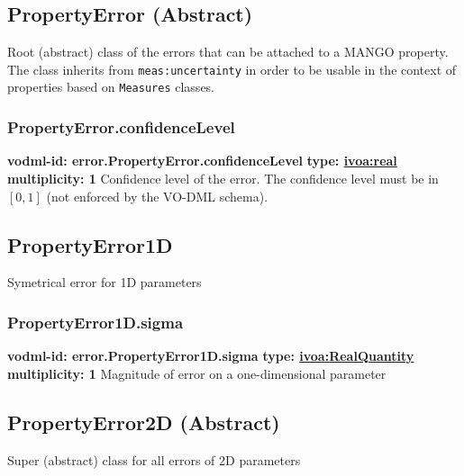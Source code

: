   \subsection{PropertyError (Abstract)}
  \label{sect:error.PropertyError}
    Root (abstract) class of the errors that can be attached to a MANGO property. The class inherits from \texttt{meas:uncertainty} in order to be usable in the context of properties based on \texttt{Measures} classes.

    \subsubsection{PropertyError.confidenceLevel}
      \textbf{vodml-id: error.PropertyError.confidenceLevel} \newline
      \textbf{type: \hyperref[sect:ivoa]{ivoa:real}} \newline
      \textbf{multiplicity: 1} \newline
      Confidence level of the error. The confidence level must be in $[0, 1]$ (not enforced by the VO-DML schema).

  \subsection{PropertyError1D}
  \label{sect:error.PropertyError1D}
    Symetrical error for 1D parameters

    \subsubsection{PropertyError1D.sigma}
      \textbf{vodml-id: error.PropertyError1D.sigma} \newline
      \textbf{type: \hyperref[sect:ivoa]{ivoa:RealQuantity}} \newline
      \textbf{multiplicity: 1} \newline
      Magnitude of error on a one-dimensional parameter

  \subsection{PropertyError2D (Abstract)}
  \label{sect:error.PropertyError2D}
    Super (abstract) class for all errors of 2D parameters

\pagebreak
